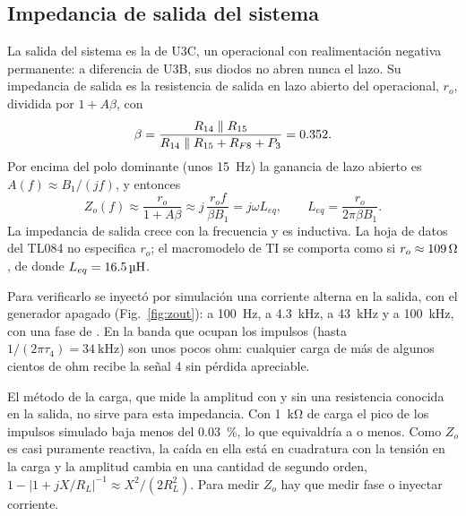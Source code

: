 \subsection{Impedancia de salida del sistema}
\label{sec:zout}
La salida del sistema es la de U3C, un operacional con realimentación negativa permanente: a diferencia de U3B, sus diodos no abren nunca el lazo. Su impedancia de salida es la resistencia de salida en lazo abierto del operacional, $r_o$, dividida por $1 + A\beta$, con
\begin{equation}
\beta = \frac{R_{14} \parallel R_{15}}{R_{14} \parallel R_{15} + R_{F8} + P_3} = \val{3}{\teoBeta}.
\end{equation}
Por encima del polo dominante (unos \SI{15}{\hertz}) la ganancia de lazo abierto es $A(f) \approx B_1/(jf)$, y entonces
\begin{equation}
Z_o(f) \approx \frac{r_o}{1 + A\beta} \approx j\,\frac{r_o f}{\beta B_1} = j\omega L_{eq}, \qquad L_{eq} = \frac{r_o}{2\pi \beta B_1}.
\end{equation}
La impedancia de salida crece con la frecuencia y es inductiva. La hoja de datos del TL084 no especifica $r_o$; el macromodelo de TI se comporta como si $r_o \approx \valu{0}{\teoRo}{\ohm}$, de donde $L_{eq} = \valu{1}{\teoLeq}{\micro\henry}$.

Para verificarlo se inyectó por simulación una corriente alterna en la salida, con el generador apagado (Fig.~\ref{fig:zout}):  a \SI{100}{\hertz},  a \SI{4,3}{\kilo\hertz},  a \SI{43}{\kilo\hertz} y  a \SI{100}{\kilo\hertz}, con una fase de . En la banda que ocupan los impulsos (hasta $1/(2\pi\tau_4) = \SI{34}{\kilo\hertz}$) son unos pocos ohm: cualquier carga de más de algunos cientos de ohm recibe la señal 4 sin pérdida apreciable.

El método de la carga, que mide la amplitud con y sin una resistencia conocida en la salida, no sirve para esta impedancia. Con \SI{1}{\kilo\ohm} de carga el pico de los impulsos simulado baja menos del \SI{0,03}{\percent}, lo que equivaldría a  o menos. Como $Z_o$ es casi puramente reactiva, la caída en ella está en cuadratura con la tensión en la carga y la amplitud cambia en una cantidad de segundo orden, $1 - |1 + jX/R_L|^{-1} \approx X^2/(2R_L^2)$. Para medir $Z_o$ hay que medir fase o inyectar corriente.

